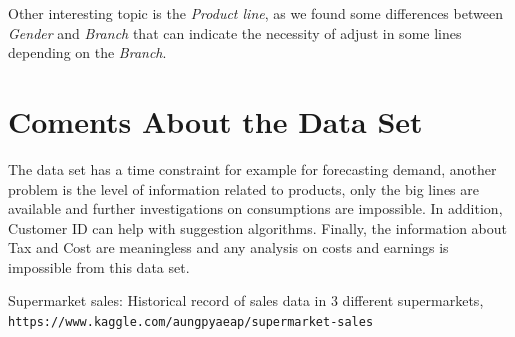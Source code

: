 \documentclass[11pt, a4]{article}
\begin{document}
Other interesting topic is the \textit{Product line}, as we found some differences between \textit{Gender} and \textit{Branch} that can indicate the necessity of adjust in some lines depending on the \textit{Branch}. 

\section*{Coments About the Data Set}

The data set has a time constraint for example for forecasting demand, another problem is the level of information related to products, only the big lines are available and further investigations on consumptions are impossible. In addition, Customer ID can help with suggestion algorithms. Finally, the information about Tax and Cost are meaningless and any analysis on costs and earnings is impossible from this data set. 

\FloatBarrier

\begin{thebibliography}{9}

Supermarket sales:
Historical record of sales data in 3 different supermarkets,
\\\texttt{https://www.kaggle.com/aungpyaeap/supermarket-sales}
\end{thebibliography}
\end{document}
